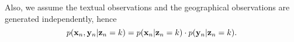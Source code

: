 Also, we assume the textual observations and the geographical observations are generated
independently, hence
$$
p(\mathbf{x}_n, \mathbf{y}_n | \mathbf{z}_n = k)  = p(\mathbf{x}_n | \mathbf{z}_n = k) \cdot p(\mathbf{y}_n | \mathbf{z}_n = k).
$$


